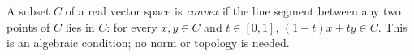 
A subset $C$ of a real vector space is \emph{convex} if the line segment between any two points of $C$ lies in $C$: for every $x,y\in C$ and $t\in[0,1]$, $(1-t)x+ty\in C$. This is an algebraic condition; no norm or topology is needed.
